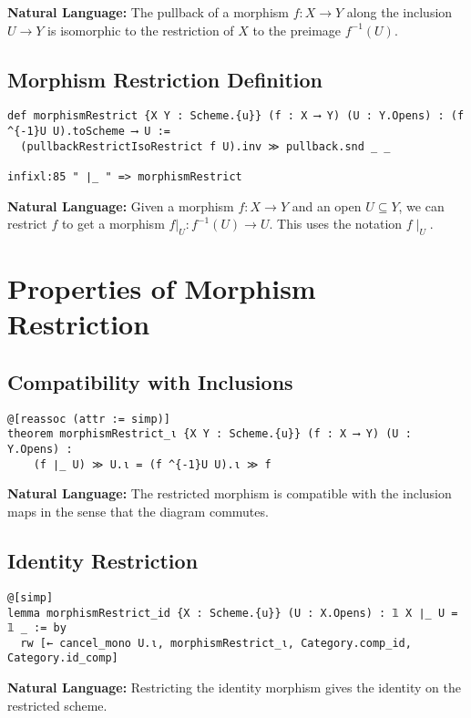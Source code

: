 \documentclass{article}
\theoremstyle{definition}
\begin{document}
\textbf{Natural Language:} The pullback of a morphism $f: X \to Y$ along the inclusion $U \to Y$ is isomorphic to the restriction of $X$ to the preimage $f^{-1}(U)$.

\subsection{Morphism Restriction Definition}

\begin{lstlisting}
def morphismRestrict {X Y : Scheme.{u}} (f : X ⟶ Y) (U : Y.Opens) : (f ^{-1}U U).toScheme ⟶ U :=
  (pullbackRestrictIsoRestrict f U).inv ≫ pullback.snd _ _

infixl:85 " ∣_ " => morphismRestrict
\end{lstlisting}

\textbf{Natural Language:} Given a morphism $f: X \to Y$ and an open $U \subseteq Y$, we can restrict $f$ to get a morphism $f|_U: f^{-1}(U) \to U$. This uses the notation $f \mid_U$.

\section{Properties of Morphism Restriction}

\subsection{Compatibility with Inclusions}

\begin{lstlisting}
@[reassoc (attr := simp)]
theorem morphismRestrict_ι {X Y : Scheme.{u}} (f : X ⟶ Y) (U : Y.Opens) :
    (f ∣_ U) ≫ U.ι = (f ^{-1}U U).ι ≫ f
\end{lstlisting}

\textbf{Natural Language:} The restricted morphism is compatible with the inclusion maps in the sense that the diagram commutes.

\subsection{Identity Restriction}

\begin{lstlisting}
@[simp]
lemma morphismRestrict_id {X : Scheme.{u}} (U : X.Opens) : 𝟙 X ∣_ U = 𝟙 _ := by
  rw [← cancel_mono U.ι, morphismRestrict_ι, Category.comp_id, Category.id_comp]
\end{lstlisting}

\textbf{Natural Language:} Restricting the identity morphism gives the identity on the restricted scheme.
\end{document}
